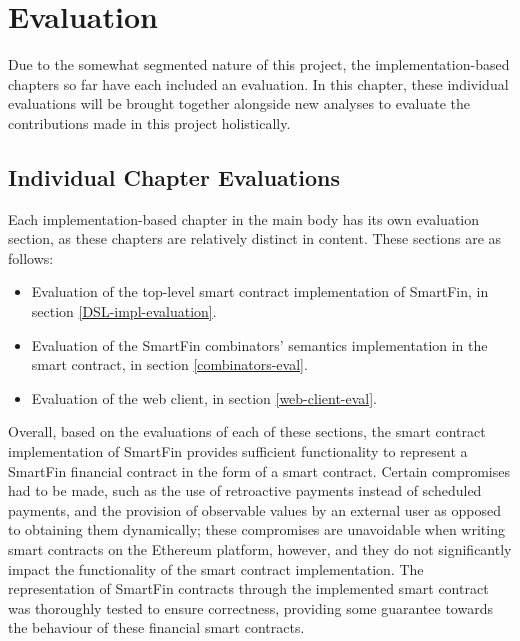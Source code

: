 \chapter{Evaluation} \label{evaluation}

Due to the somewhat segmented nature of this project, the implementation-based chapters so far have each included an evaluation. In this chapter, these individual evaluations will be brought together alongside new analyses to evaluate the contributions made in this project holistically.


\section{Individual Chapter Evaluations}

Each implementation-based chapter in the main body has its own evaluation section, as these chapters are relatively distinct in content. These sections are as follows:

\begin{itemize}
    \item Evaluation of the top-level smart contract implementation of SmartFin, in section \ref{DSL-impl-evaluation}.
    \item Evaluation of the SmartFin combinators' semantics implementation in the smart contract, in section \ref{combinators-eval}.
    \item Evaluation of the web client, in section \ref{web-client-eval}. \\
\end{itemize}

Overall, based on the evaluations of each of these sections, the smart contract implementation of SmartFin provides sufficient functionality to represent a SmartFin financial contract in the form of a smart contract. Certain compromises had to be made, such as the use of retroactive payments instead of scheduled payments, and the provision of observable values by an external user as opposed to obtaining them dynamically; these compromises are unavoidable when writing smart contracts on the Ethereum platform, however, and they do not significantly impact the functionality of the smart contract implementation. The representation of SmartFin contracts through the implemented smart contract was thoroughly tested to ensure correctness, providing some guarantee towards the behaviour of these financial smart contracts. \\

